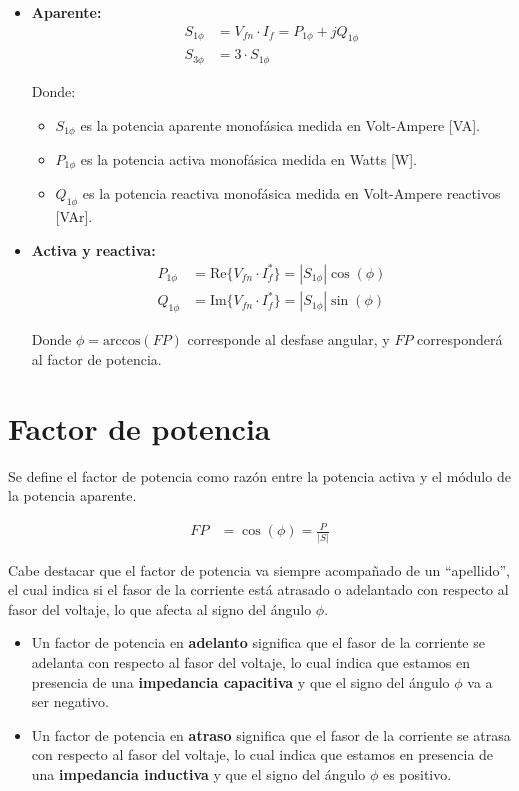 \documentclass[
  11pt,
  letterpaper,
   addpoints,
   answers
  ]{exam}
\begin{document}
\begin{itemize}
    \item \textbf{Aparente:}
    \begin{align}
        S_{1\phi} &= V_{fn} \cdot I_{f} = P_{1\phi} + jQ_{1\phi} \\
        S_{3\phi} &= 3 \cdot S_{1\phi}
    \end{align}
    
    Donde:
    \begin{itemize}
        \item $S_{1\phi}$ es la potencia aparente monofásica medida en Volt-Ampere [VA].
        \item $P_{1\phi}$ es la potencia activa monofásica medida en Watts [W].
        \item $Q_{1\phi}$ es la potencia reactiva monofásica medida en Volt-Ampere reactivos [VAr].
    \end{itemize}
    
    \item \textbf{Activa y reactiva:}
    \begin{align}
        P_{1\phi} &= \text{Re}\{V_{fn} \cdot I_{f}^*\} = |S_{1\phi}|\cos(\phi) \\
        Q_{1\phi} &= \text{Im}\{V_{fn} \cdot I_{f}^*\} = |S_{1\phi}|\sin(\phi)
    \end{align}
    
    Donde $\phi = \text{arccos}(FP)$ corresponde al desfase angular, y $FP$ corresponderá al factor de potencia.
    
\end{itemize}

\section*{Factor de potencia}

Se define el factor de potencia como razón entre la potencia activa y el módulo de la potencia aparente.

\begin{align}
FP &= \cos(\phi) = \frac{P}{|S|}
\end{align}

Cabe destacar que el factor de potencia va siempre acompañado de un “apellido”, el cual indica si el fasor de la corriente está atrasado o adelantado con respecto al fasor del voltaje, lo que afecta al signo del ángulo $\phi$.

\begin{itemize}
    \item Un factor de potencia en \textbf{adelanto} significa que el fasor de la corriente se adelanta con respecto al fasor del voltaje, lo cual indica que estamos en presencia de una \textbf{impedancia capacitiva} y que el signo del ángulo $\phi$ va a ser negativo.
    \item Un factor de potencia en \textbf{atraso} significa que el fasor de la corriente se atrasa con respecto al fasor del voltaje, lo cual indica que estamos en presencia de una \textbf{impedancia inductiva} y que el signo del ángulo $\phi$ es positivo.
\end{itemize}
\end{document}
